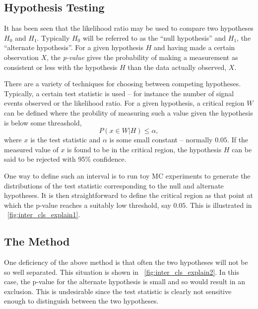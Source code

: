 \subsection{Hypothesis Testing}
\label{sec:inter_cls}
It has been seen that the likelihood ratio may be used to compare two hypotheses
$H_0$ and $H_1$. Typically $H_0$ will be referred to as the ``null hypothesis''
and $H_1$, the ``alternate hypothesis''. For a given hypothesis $H$ and having
made a certain observation $X$, the \emph{p-value} gives the probability of
making a measurement as consistent or less with the hypothesis $H$ than the data
actually observed, $X$.

There are a variety of techniques for choosing between competing
hypotheses. Typically, a certain test statistic is used -- for instance the
number of signal events observed or the likelihood ratio. For a given
hypothesis, a critical region $W$ can be defined where the probility of measuring
such a value given the hypothesis is below some threashold,
\begin{equation*}
P\left(x \in W|H\right) \leq \alpha,
\end{equation*}
where $x$ is the test statistic and $\alpha$ is some small constant -- normally
$0.05$. If the measured value of $x$ is found to be in the critical region, the
hypothesis $H$ can be said to be rejected with 95\% confidence.

One way to define such an interval is to run toy \ac{MC} experiments to
generate the distributions of the test statistic corresponding to the null and
alternate hypotheses. It is then straightforward to define the critical region
as that point at which the p-value reaches a suitably low threshold, say
$0.05$. This is illustrated in \fig~\ref{fig:inter_cls_explain1}.

\begin{figure}[h!]
\centering
{}
\caption[]{}
\label{fig:inter_cls_explain}
\end{figure}

\subsection{The \CLs Method}
One deficiency of the above method is that often the two hypotheses will not be
so well separated. This situation is shown in
\fig~\ref{fig:inter_cls_explain2}. In this case, the p-value for the alternate
hypothesis is small and so would result in an exclusion. This is undesirable
since the test statistic is clearly not sensitive enough to distinguish between
the two hypotheses.

